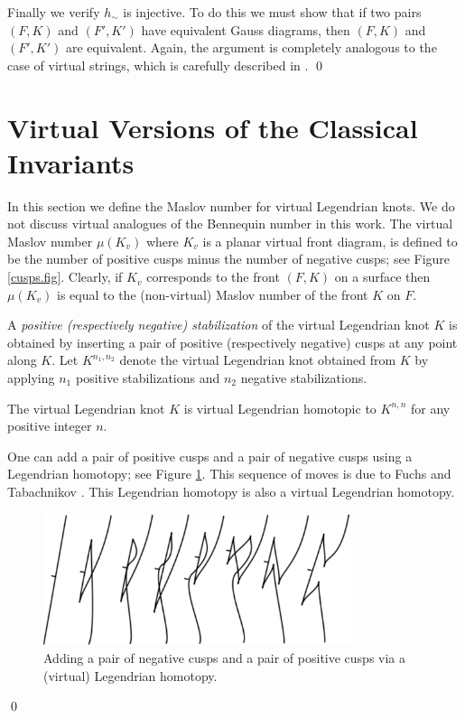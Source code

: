 Finally we verify $h_\sim$ is injective.  To do this we must show that if two pairs $(F,K)$ and $(F',K')$ have equivalent Gauss diagrams, then $(F,K)$ and $(F',K')$ are equivalent.  Again, the argument is completely analogous to the case of virtual strings, which is carefully described in \cite{Turaev}. 
\qed

\section{Virtual Versions of the Classical Invariants}\label{classical.sec}

In this section we define the Maslov number for virtual Legendrian knots.  We do not discuss virtual analogues of the Bennequin number in this work. The virtual Maslov number $\mu(K_v)$ where $K_v$ is a planar virtual front diagram, is defined to be the number of positive cusps minus the number of negative cusps; see Figure \ref{cusps.fig}.  Clearly, if $K_v$ corresponds to the front $(F,K)$ on a surface then $\mu(K_v)$ is equal to the (non-virtual) Maslov number of the front $K$ on $F$.

A {\it positive (respectively negative) stabilization} of the virtual Legendrian knot $K$ is obtained by inserting a pair of positive (respectively negative) cusps at any point along $K$.  Let $K^{n_1,n_2}$ denote the virtual Legendrian knot obtained from $K$ by applying $n_1$ positive stabilizations and $n_2$ negative stabilizations.  

\begin{prop}\label{propposnegstab} The virtual Legendrian knot $K$ is virtual Legendrian homotopic to $K^{n,n}$ for any positive integer $n$.
\end{prop}
\pp One can add a pair of positive cusps and a pair of negative cusps using a Legendrian homotopy; see Figure \ref{homotopyposnegstabilization}.  This sequence of moves is due to Fuchs and Tabachnikov \cite{ft}.  This Legendrian homotopy is also a virtual Legendrian homotopy.
\begin{figure}[htbp]\includegraphics[width=9cm]{homotopyposnegstabilization}
	\centering
	\caption{Adding a pair of negative cusps and a pair of positive cusps via a (virtual) Legendrian homotopy.}
	\label{homotopyposnegstabilization}
\end{figure}
\qed

